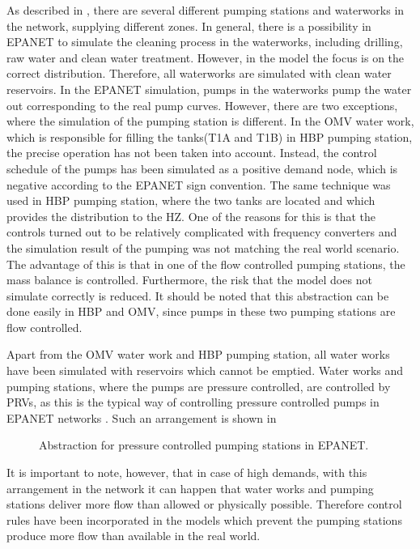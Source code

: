 As described in , there are several different pumping stations and waterworks in the network, supplying different zones. In general, there is a possibility in EPANET to simulate the cleaning process in the waterworks, including drilling, raw water and clean water treatment. However, in the model the focus is on the correct distribution. Therefore, all waterworks are simulated with clean water reservoirs. In the EPANET simulation, pumps in the waterworks pump the water out corresponding to the real pump curves. However, there are two exceptions, where the simulation of the pumping station is different. In the OMV water work, which is responsible for filling the tanks(T1A and T1B) in HBP pumping station, the precise operation has not been taken into account. Instead, the control schedule of the pumps has been simulated as a positive demand node, which is negative according to the EPANET sign convention. The same technique was used in HBP pumping station, where the two tanks are located and which provides the distribution to the HZ. One of the reasons for this is that the controls turned out to be relatively complicated with frequency converters and the simulation result of the pumping was not matching the real world scenario. The advantage of this is that in one of the flow controlled pumping stations, the mass balance is controlled. Furthermore, the risk that the model does not simulate correctly is reduced. It should be noted that this abstraction can be done easily in HBP and OMV, since pumps in these two pumping stations are flow controlled. 

Apart from the OMV water work and HBP pumping station, all water works have been simulated with reservoirs which cannot be emptied. Water works and pumping stations, where the pumps are pressure controlled, are controlled by PRVs, as this is the typical way of controlling pressure controlled pumps in EPANET networks \cite{agency2016epanet}. Such an arrangement is shown in  

\begin{figure}[H]
\centering
 
\caption{Abstraction for pressure controlled pumping stations in EPANET.}
\label{fig:PRV_EPANET}
\end{figure}

\vspace{-3mm}
It is important to note, however, that in case of high demands, with this arrangement in the network it can happen that water works and pumping stations deliver more flow than allowed or physically possible. Therefore control rules have been incorporated in the models which prevent the pumping stations produce more flow than available in the real world. 

